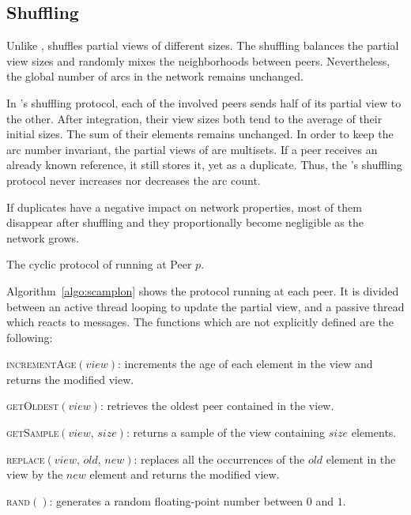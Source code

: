 \subsection{Shuffling}
\label{subsec:cyclic}

Unlike \CYCLON, \SPRAY shuffles partial views of different sizes. The
shuffling balances the partial view sizes and randomly mixes the
neighborhoods between peers. Nevertheless, the global number of arcs
in the network remains unchanged.

In \SPRAY's shuffling protocol, each of the involved peers sends half of its
partial view to the other. After integration, their view sizes both tend to the
average of their initial sizes. The sum of their elements remains unchanged. In
order to keep the arc number invariant, the partial views of \SPRAY are
multisets. If a peer receives an already known reference, it still stores it,
yet as a duplicate. Thus, the \SPRAY's shuffling protocol never increases nor
decreases the arc count.

If duplicates have a negative impact on network properties, most of
them disappear after shuffling and they proportionally become
negligible as the network grows.

\begin{algorithm}[h]
  
  \caption{\label{algo:scamplon}The cyclic protocol of \SPRAY running at Peer
    $p$.}
\end{algorithm}

Algorithm~\ref{algo:scamplon} shows the \SPRAY protocol running at
each peer. It is divided between an active thread looping to update
the partial view, and a passive thread which reacts to messages. The
functions which are not explicitly defined are the following:
\begin{compactitem}
\item \textsc{incrementAge}$(view)$: increments the age of each element in the view
  and returns the modified view.
\item \textsc{getOldest}$(view)$: retrieves the oldest peer contained in the view.
\item \textsc{getSample}$(view, \, size)$: returns a sample of the view containing
  $size$ elements.
\item \textsc{replace}$(view,\,old,\,new)$: replaces all the occurrences of the
  $old$ element in the view by the $new$ element and returns the
  modified view.
\item \textsc{rand}$()$: generates a random floating-point number between $0$
  and $1$.
\end{compactitem}

